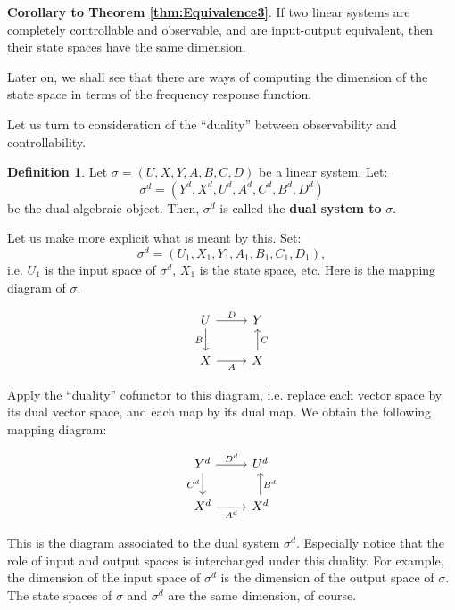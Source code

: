 \documentclass[12pt]{book}
\theoremstyle{plain}
\theoremstyle{definition}
\newtheorem{definition}{Definition}[section]
\begin{document}
\textbf{Corollary to Theorem \ref{thm:Equivalence3}}.
If two linear systems are completely controllable and observable, and are input-output equivalent, then their state spaces have the same dimension.

Later on, we shall see that there are ways of computing the dimension of the state space in terms of the frequency response function.

Let us turn to consideration of the ``duality'' between observability and controllability.

\begin{definition}
    Let $\sigma = (U, X, Y, A, B, C, D)$ be a linear system.
    Let:
    $$\sigma^d = (Y^d, X^d, U^d, A^d, C^d, B^d, D^d)$$
    be the dual algebraic object. Then, $\sigma^d$ is called the \textbf{dual system to} $\sigma$.
\end{definition}

Let us make more explicit what is meant by this.
Set:
$$\sigma^d = (U_1, X_1, Y_1, A_1, B_1, C_1, D_1),$$
i.e. $U_1$ is the input space of $\sigma^d$, $X_1$ is the state space, etc.
Here is the mapping diagram of $\sigma$.

\begin{equation*}
\begin{tikzcd} \label{diag:LinearSystem2}
    U \ar[r,"D"] \ar[d,"B"'] & Y \\
    X \ar[r,"A"'] & X \ar[u,"C"']
\end{tikzcd}
\end{equation*}

Apply the ``duality'' cofunctor to this diagram, i.e. replace each vector space by its dual vector space, and each map by its dual map.
We obtain the following mapping diagram:

\begin{equation*}
\begin{tikzcd} \label{diag:LinearSystem3}
    Y^d \ar[r,"D^d"] \ar[d,"C^d"'] & U^d \\
    X^d \ar[r,"A^d"'] & X^d \ar[u,"B^d"']
\end{tikzcd}
\end{equation*}

This is the diagram associated to the dual system $\sigma^d$.
Especially notice that the role of input and output spaces is interchanged under this duality.
For example, the dimension of the input space of $\sigma^d$ is the dimension of the output space of $\sigma$.
The state spaces of $\sigma$ and $\sigma^d$ are the same dimension, of course.
\end{document}
